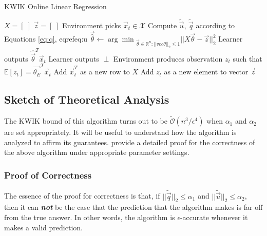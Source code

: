\begin{algorithm}[H]
\caption{KWIK Online Linear Regression}
\label{alg:linreg}
\begin{algorithmic}
	\State $X = [\;]$
	\State $\vec{z} = [\;]$
		\State Environment picks $\vec{x}_t \in \mathcal{X}$
		\State Compute $\tilde{\vec{u}}$, $\tilde{\vec{q}}$ according to Equations \eqref{eq:q}, eqref{eq:u}		
			\State  $\vec{\hat{\theta}} \gets {\arg\min}_{\vec{\theta} \in \mathbb{R}^n: ||vec{\theta}||_2 \leq 1} ||X\vec{\theta} - \vec{z}||_2^2$
			\State Learner outputs $\hat{\vec{\theta}}^T \vec{x}_t$
		\Else
			\State Learner outputs $\perp$
			\State Environment produces observation $z_t$ such that $\mathbb{E}[z_t] = \vec{\theta_E}^T \vec{x}_t$
			\State Add $\vec{x}_t^T$ as a new row to $X$
			\State Add $z_t$ as a new element to vector $\vec{z}$
		\EndIf
    \EndFor
\end{algorithmic}
\end{algorithm}

\subsection{Sketch of Theoretical Analysis}
The KWIK bound of this algorithm turns out to be $\tilde{\mathcal{O}}\left(n^3/\epsilon^4\right)$
when $\alpha_1$ and $\alpha_2$ are set appropriately. It will be useful to understand how the algorithm is analyzed to affirm its guarantees. 
\citet{Li:2011:KKF:1968770.1968789} provide a detailed proof for the correctness of the above algorithm under appropriate parameter settings. \\

\subsubsection{Proof of Correctness}

The essence of the proof for correctness is that, if $||\tilde{\vec{q}}||_2  \leq \alpha_1$ and $||\tilde{\vec{u}} ||_2 \leq \alpha_2$, then it can \textit{\textbf{not}} be the case that the prediction that the algorithm makes is far off from the true answer. In other words, the algorithm is $\epsilon$-accurate whenever it makes a valid prediction. \\

